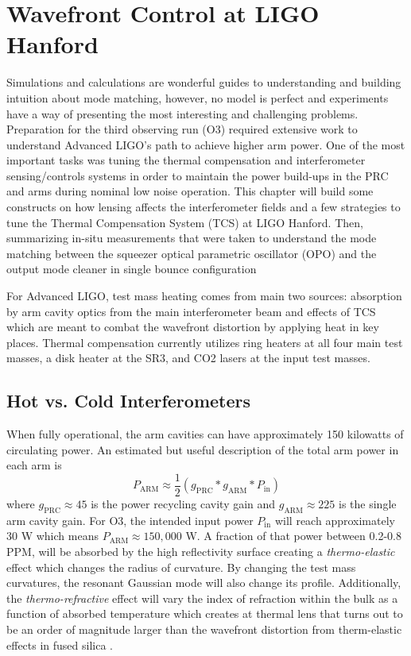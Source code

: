 \chapter{Wavefront Control at LIGO Hanford}\label{chapter:MM_LHO}
	Simulations and calculations are wonderful guides to understanding and building intuition about mode matching, however, no model is perfect and experiments have a way of presenting the most interesting and challenging problems.  Preparation for the third observing run (O3) required extensive work to understand Advanced LIGO's path to achieve higher arm power.  One of the most important tasks was tuning the thermal compensation and interferometer sensing/controls systems in order to maintain the power build-ups in the PRC and arms during nominal low noise operation.  This chapter will build some constructs on how lensing affects the interferometer fields and a few strategies to tune the Thermal Compensation System (TCS) at LIGO Hanford. Then, summarizing in-situ measurements that were taken to understand the mode matching between the squeezer optical parametric oscillator (OPO) and the output mode cleaner in single bounce configuration
	
	For Advanced LIGO, test mass heating comes from main two sources: absorption by arm cavity optics from the main interferometer beam and effects of TCS which are meant to combat the wavefront distortion by applying heat in key places.  Thermal compensation currently utilizes ring heaters at all four main test masses, a disk heater at the SR3, and CO2 lasers at the input test masses.
	
	\section{Hot vs. Cold Interferometers}\label{sec:hotcoldifo}
	When fully operational, the arm cavities can have approximately 150 kilowatts of circulating power. An estimated but useful description of the total arm power in each arm is
	\begin{equation}
		P_{\text{ARM}} \approx \frac{1}{2} (g_{\text{PRC}} * g_{\text{ARM}} * P_{\text{in}})
	\end{equation}
	where $g_{\text{PRC}} \approx 45$ is the power recycling cavity gain and $g_{\text{ARM}} \approx 225$ is the single arm cavity gain. For O3, the intended input power $P_{\text{in}}$ will reach approximately 30 W which means $P_{\text{ARM}} \approx 150,000$ W. A fraction of that power between 0.2-0.8 PPM, will be absorbed by the high reflectivity surface creating a \textit{thermo-elastic} effect which changes the radius of curvature. By changing the test mass curvatures, the resonant Gaussian mode will also change its profile. Additionally, the \textit{thermo-refractive} effect will vary the index of refraction within the bulk as a function of absorbed temperature which creates at thermal lens that turns out to be an order of magnitude larger than the wavefront distortion from therm-elastic effects in fused silica \cite{winkler_thermaldist}.
	
